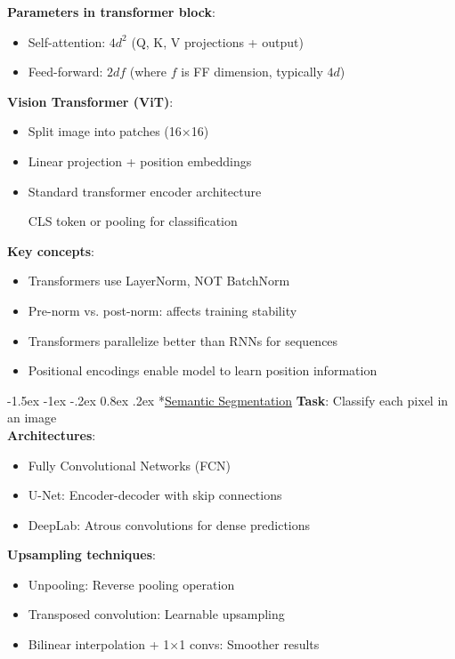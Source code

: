 \documentclass{article}
\makeatletter
\renewcommand\section{\@startsection{section}{1}{\z@}%
                                  {-1.5ex \@plus -1ex \@minus -.2ex}%
                                  {0.8ex \@plus.2ex}%
                                  {\normalfont\small\bfseries}}
\makeatother
\begin{document}
\begin{multicols}{3}
\textbf{Parameters in transformer block}:
\begin{itemize}
\item Self-attention: $4d^2$ (Q, K, V projections + output)
\item Feed-forward: $2df$ (where $f$ is FF dimension, typically $4d$)
\end{itemize}

\textbf{Vision Transformer (ViT)}:
\begin{itemize}
\item Split image into patches (16×16)
\item Linear projection + position embeddings
\item Standard transformer encoder architecture
\item [CLS] token or pooling for classification
\end{itemize}

\textbf{Key concepts}:
\begin{itemize}
\item Transformers use LayerNorm, NOT BatchNorm
\item Pre-norm vs. post-norm: affects training stability
\item Transformers parallelize better than RNNs for sequences
\item Positional encodings enable model to learn position information
\end{itemize}

\section*{\underline{Semantic Segmentation}}
\textbf{Task}: Classify each pixel in an image\\
\textbf{Architectures}:
\begin{itemize}
\item Fully Convolutional Networks (FCN)
\item U-Net: Encoder-decoder with skip connections
\item DeepLab: Atrous convolutions for dense predictions
\end{itemize}

\textbf{Upsampling techniques}:
\begin{itemize}
\item Unpooling: Reverse pooling operation
\item Transposed convolution: Learnable upsampling
\item Bilinear interpolation + 1×1 convs: Smoother results
\end{itemize}


\end{multicols}
\end{document}
